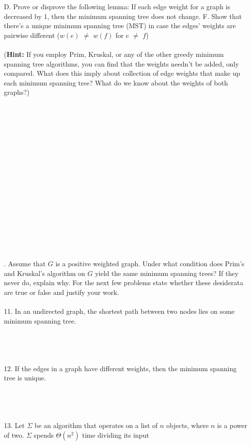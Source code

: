 \documentclass[12pt]{article}
\begin{document}
D. Prove or disprove the following lemma: If each edge weight for a graph is decreased by 1, then the minimum spanning tree does not change.
\newpage
\noindent F. Show that there's a unique minimum spanning tree (MST) in case the edges' weights are pairwise different ($w(e)$ $\neq$ $w(f)$ for $e$ $\neq$ $f$)\\\\
(\textbf{Hint: }If you employ Prim, Kruskal, or any of the other greedy minimum spanning tree algorithms, you can find that the weights needn't be added, only compared. 
What does this imply about collection of edge weights that make up each minimum spanning tree? What do we know about the weights of both graphs?)\\\\\\\\\\\\\\\\\\\\\\\\\\\\\\\\\\\\
. Assume that $G$ is a positive weighted graph. 
Under what condition does Prim's and Kruskal's algorithm on $G$  
yield the same minimum spanning trees? If they never do, explain why.
\newpage
\noindent For the next few problems state whether these desiderata are true or false and justify your work.\\\\
11. In an undirected graph, the shortest path between two nodes lies on some minimum spanning
tree.\\\\\\\\\\
12. If the edges in a graph have different weights, then the minimum spanning tree is unique.\\\\\\\\\\
13. Let $\Sigma$ be an algorithm that operates on a list of $n$ objects, 
where $n$ is a power of two. $\Sigma$ spends $\Theta(n^2)$ time dividing its input 
\end{document}
